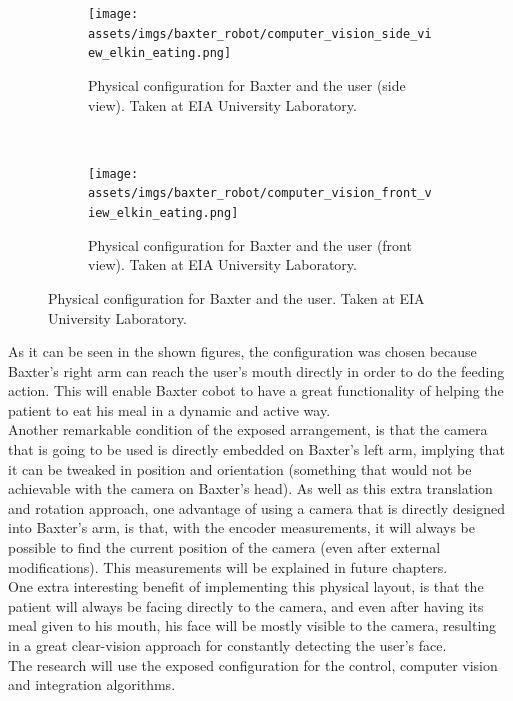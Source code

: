 \documentclass[11pt]{report} %
\begin{document}
\begin{figure}[H]
	\centering
	\begin{subfigure}{.5\textwidth}
		\centering
		\texttt{[image: assets/imgs/baxter\_robot/computer\_vision\_side\_view\_elkin\_eating.png]}
		\caption{Physical configuration for Baxter and the user (side view). Taken at EIA University Laboratory.}
		\label{fig_baxter_configuration_2a}
	\end{subfigure}~
	\begin{subfigure}{.5\textwidth}
		\centering
		\texttt{[image: assets/imgs/baxter\_robot/computer\_vision\_front\_view\_elkin\_eating.png]}
		\caption{Physical configuration for Baxter and the user (front view). Taken at EIA University Laboratory.}
		\label{fig_baxter_configuration_2b}
	\end{subfigure}%
	\caption{Physical configuration for Baxter and the user. Taken at EIA University Laboratory.}
	\label{fig_baxter_configuration_2}
\end{figure}


As it can be seen in the shown figures, the configuration was chosen because Baxter's right arm can reach the user's mouth directly in order to do the feeding action. This will enable Baxter cobot to have a great functionality of helping the patient to eat his meal in a dynamic and active way.\\

Another remarkable condition of the exposed arrangement, is that the camera that is going to be used is directly embedded on Baxter's left arm, implying that it can be tweaked in position and orientation (something that would not be achievable with the camera on Baxter's head). As well as this extra translation and rotation approach, one advantage of using a camera that is directly designed into Baxter's arm, is that, with the encoder measurements, it will always be possible to find the current position of the camera (even after external modifications). This measurements will be explained in future chapters.\\

One extra interesting benefit of implementing this physical layout, is that the patient will always be facing directly to the camera, and even after having its meal given to his mouth, his face will be mostly visible to the camera, resulting in a great clear-vision approach for constantly detecting the user's face.\\

The research will use the exposed configuration for the control, computer vision and integration algorithms.\\
\end{document}
